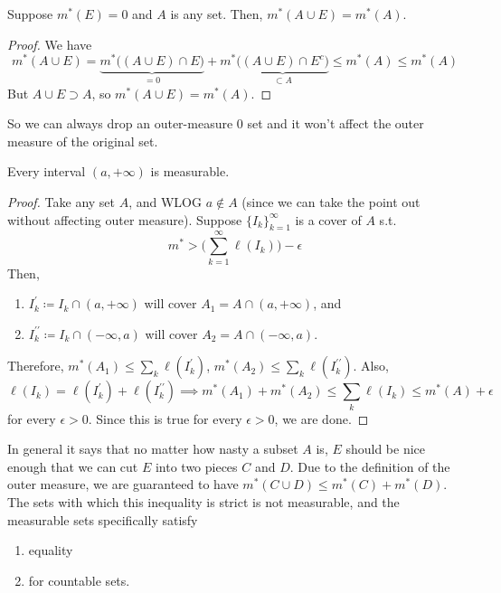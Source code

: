   \begin{lemma}
    Suppose $m^\ast (E) = 0$ and $A$ is any set. Then, $m^\ast (A \cup E) = m^\ast (A)$. 
  \end{lemma}
  \begin{proof}
    We have 
    \begin{equation}
      m^\ast (A \cup E) = \underbrace{m^\ast \big( (A \cup E) \cap E \big)}_{=0} + m^\ast \underbrace{\big( (A \cup E) \cap E^c \big)}_{\subset A} \leq m^\ast (A) \leq m^\ast (A)
    \end{equation}
    But $A \cup E \supset A$, so $m^\ast (A \cup E) = m^\ast (A)$. 
  \end{proof}

  So we can always drop an outer-measure $0$ set and it won't affect the outer measure of the original set. 

  \begin{theorem}
    Every interval $(a, +\infty)$ is measurable. 
  \end{theorem}
  \begin{proof}
    Take any set $A$, and WLOG $a \not\in A$ (since we can take the point out without affecting outer measure). Suppose $\{I_k\}_{k=1}^\infty$ is a cover of $A$ s.t. 
    \begin{equation}
      m^\ast > \bigg( \sum_{k=1}^\infty \ell (I_k) \bigg) - \epsilon 
    \end{equation}
    Then, 
    \begin{enumerate}
      \item $I_k^\prime \coloneqq I_k \cap (a, +\infty)$ will cover $A_1 = A \cap (a, +\infty)$, and 
      \item $I_k^{\prime\prime} \coloneqq I_k \cap (-\infty, a)$ will cover $A_2 = A \cap (-\infty, a)$. 
    \end{enumerate}
    Therefore, $m^\ast (A_1)  \leq \sum_k \ell(I_k^\prime)$, $m^\ast (A_2) \leq \sum_k \ell(I_k^{\prime\prime})$. Also, 
    \begin{equation}
      \ell(I_k) = \ell(I_k^\prime) + \ell(I_k^{\prime\prime}) \implies m^\ast (A_1) + m^\ast (A_2) \leq \sum_k \ell(I_k) \leq m^\ast (A) + \epsilon
    \end{equation}
    for every $\epsilon > 0$. Since this is true for every $\epsilon > 0$, we are done.  
  \end{proof}

  In general it says that no matter how nasty a subset $A$ is, $E$ should be nice enough that we can cut $E$ into two pieces $C$ and $D$. Due to the definition of the outer measure, we are guaranteed to have  $m^\ast (C \cup D) \leq m^\ast (C) + m^\ast (D)$. The sets with which this inequality is strict is not measurable, and the measurable sets specifically satisfy 
  \begin{enumerate}
    \item equality 
    \item for countable sets. 
  \end{enumerate}

